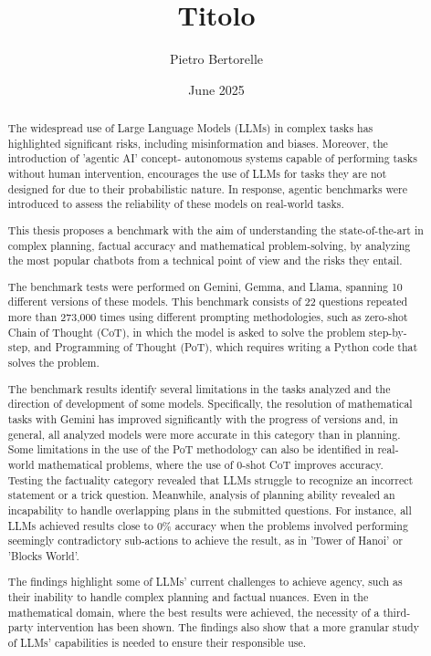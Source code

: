 \documentclass[12pt]{article}
\title{Titolo}
\author{Pietro Bertorelle}
\date{June 2025}
\begin{document}


\clearpage
\begin{abstract}
The widespread use of Large Language Models (LLMs) in complex tasks has highlighted significant risks, including misinformation and biases. Moreover, the introduction of 'agentic AI' concept- autonomous systems capable of performing tasks without human intervention, encourages the use of LLMs for tasks they are not designed for due to their probabilistic nature. In response, agentic benchmarks were introduced to assess the reliability of these models on real-world tasks.

This thesis proposes a benchmark with the aim of understanding the state-of-the-art in complex planning, factual accuracy and mathematical problem-solving, by analyzing the most popular chatbots from a technical point of view and the risks they entail.

The benchmark tests were performed on Gemini, Gemma, and Llama, spanning 10 different versions of these models. This benchmark consists of 22 questions repeated more than 273,000 times using different prompting methodologies, such as zero-shot Chain of Thought (CoT), in which the model is asked to solve the problem step-by-step, and Programming of Thought (PoT), which requires writing a Python code that solves the problem.

The benchmark results identify several limitations in the tasks analyzed and the direction of development of some models. Specifically, the resolution of mathematical tasks with Gemini has improved significantly with the progress of versions and, in general, all analyzed models were more accurate in this category than in planning. Some limitations in the use of the PoT methodology can also be identified in real-world mathematical problems, where the use of 0-shot CoT improves accuracy.\\ 
Testing the factuality category revealed that LLMs struggle to recognize an incorrect statement or a trick question. Meanwhile, analysis of planning ability revealed an incapability to handle overlapping plans in the submitted questions. For instance, all LLMs achieved results close to $0\%$ accuracy when the problems involved performing seemingly contradictory sub-actions to achieve the result, as in 'Tower of Hanoi' or 'Blocks World'.

The findings highlight some of LLMs' current challenges to achieve agency, such as their inability to handle complex planning and factual nuances. Even in the mathematical domain, where the best results were achieved, the necessity of a third-party intervention has been shown. The findings also show that a more granular study of LLMs' capabilities is needed to ensure their responsible use.

\end{abstract}
\end{document}
